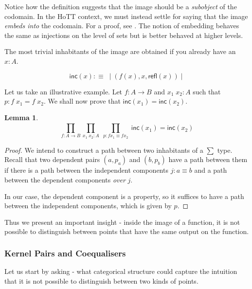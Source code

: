 \documentclass{article}
\newcommand{\id}[1]{\mathsf{#1}}
\newtheorem{lemma}[theorem]{Lemma}
\theoremstyle{plain}
\theoremstyle{remark}
\begin{document}
Notice how the definition suggests that the image should be a \emph{subobject} of the codomain. 
In the HoTT context, we must instead settle for saying that the image \emph{embeds into} the codomain. For a proof, see \citep{The_Agda_Community_Cubical_Agda_Library_2023}. 
The notion of embedding behaves the same as injections on the level of sets but is better behaved at higher levels. 

The most trivial inhabitants of the image are obtained if you already have an $x : A$. 

\begin{equation*}
    \id{inc}(x) :\equiv \; \mid (f (x) , x , \id{refl}(x)) \mid 
\end{equation*}

Let us take an illustrative example. Let $f : A \to B$ and $x_1 \; x_2 : A$ such that $p : f \; x_1 = f \; x_2$. 
We shall now prove that $\id{inc}(x_1) = \id{inc}(x_2)$.

\begin{lemma}
    \begin{equation*}
        \prod_{f : A \to B}^{} \prod_{x_1 \; x_2 : A}^{} \; \prod_{p : f x_1 \equiv f x_2} \; \id{inc}(x_1) = \id{inc}(x_2)    
    \end{equation*}
    
\end{lemma}

\begin{proof}
    We intend to construct a path between two inhabitants of a $\sum$ type. 
    Recall that two dependent pairs $(a, p_a)$ and $(b,p_b)$ have a path between them if there is a path between the independent components $j : a \equiv b$ and a path between the dependent components \emph{over} $j$. 

    In our case, the dependent component is a property, so it suffices to have a path between the independent components, which is given by $p$.
\end{proof}

Thus we present an important insight - inside the image of a function, it is not possible to distinguish between points that have the same output on the function.

\subsubsection{Kernel Pairs and Coequalisers}

Let us start by asking - what categorical structure could capture the intuition that it is not possible to distinguish between two kinds of points. 
\end{document}
